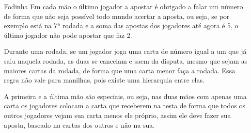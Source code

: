 \begin{subsecao}{Fodinha}
Em cada mão o último jogador a apostar é obrigado a falar um número de forma que não seja
possível todo mundo acertar a aposta, ou seja, se por exemplo está na 7ª rodada e a soma das
apostas dos jogadores até agora é 5, o último jogador não pode apostar que faz 2.

Durante uma rodada, se um jogador joga uma carta de número igual a um que já saiu naquela
rodada, as duas se cancelam e saem da disputa, mesmo que sejam as maiores cartas da rodada,
de forma que uma carta menor faça a rodada. Essa regra não vale para manilhas, pois existe uma
hierarquia entre elas.

A primeira e a última mão são especiais, ou seja, nas duas mãos com apenas uma 
carta os jogadores colocam a carta que receberem na testa de forma que todos os outros jogadores 
vejam sua carta menos ele próprio, assim ele deve fazer sua aposta, baseado na cartas dos outros e
não na sua.

\end{subsecao}

